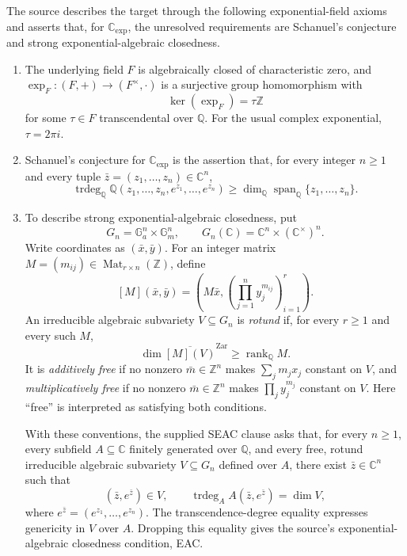 \documentclass[11pt]{article}
\newcommand{\Z}{\mathbb{Z}}
\newcommand{\Q}{\mathbb{Q}}
\newcommand{\C}{\mathbb{C}}
\begin{document}
The source describes the target through the following exponential-field axioms and asserts that, for \(\mathbb C_{\exp}\), the unresolved requirements are Schanuel's conjecture and strong exponential-algebraic closedness.
\begin{enumerate}
\item The underlying field \(F\) is algebraically closed of characteristic zero, and \(\exp_F:(F,+)\to(F^\times,\cdot)\) is a surjective group homomorphism with
\[
\ker(\exp_F)=\tau\Z
\]
for some \(\tau\in F\) transcendental over \(\Q\). For the usual complex exponential, \(\tau=2\pi i\).
\item Schanuel's conjecture for \(\mathbb C_{\exp}\) is the assertion that, for every integer \(n\geq1\) and every tuple \(\bar z=(z_1,\ldots,z_n)\in\C^n\),
\[
\operatorname{trdeg}_{\Q}\Q(z_1,\ldots,z_n,e^{z_1},\ldots,e^{z_n})
\geq
\dim_{\Q}\operatorname{span}_{\Q}\{z_1,\ldots,z_n\}.
\]
\item To describe strong exponential-algebraic closedness, put
\[
G_n=\mathbb G_a^n\times\mathbb G_m^n,
\qquad G_n(\C)=\C^n\times(\C^\times)^n.
\]
Write coordinates as \((\bar x,\bar y)\). For an integer matrix \(M=(m_{ij})\in\operatorname{Mat}_{r\times n}(\Z)\), define
\[
[M](\bar x,\bar y)=\left(M\bar x,\left(\prod_{j=1}^n y_j^{m_{ij}}\right)_{i=1}^r\right).
\]
An irreducible algebraic subvariety \(V\subseteq G_n\) is \emph{rotund} if, for every \(r\geq1\) and every such \(M\),
\[
\dim\overline{[M](V)}^{\mathrm{Zar}}\geq\operatorname{rank}_{\Q}M.
\]
It is \emph{additively free} if no nonzero \(\bar m\in\Z^n\) makes \(\sum_jm_jx_j\) constant on \(V\), and \emph{multiplicatively free} if no nonzero \(\bar m\in\Z^n\) makes \(\prod_jy_j^{m_j}\) constant on \(V\). Here ``free'' is interpreted as satisfying both conditions.

With these conventions, the supplied SEAC clause asks that, for every \(n\geq1\), every subfield \(A\subseteq\C\) finitely generated over \(\Q\), and every free, rotund irreducible algebraic subvariety \(V\subseteq G_n\) defined over \(A\), there exist \(\bar z\in\C^n\) such that
\[
(\bar z,e^{\bar z})\in V,
\qquad
\operatorname{trdeg}_{A}A(\bar z,e^{\bar z})=\dim V,
\]
where \(e^{\bar z}=(e^{z_1},\ldots,e^{z_n})\). The transcendence-degree equality expresses genericity in \(V\) over \(A\). Dropping this equality gives the source's exponential-algebraic closedness condition, EAC.


\end{enumerate}
\end{document}
